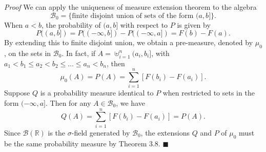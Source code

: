 \noindent\textit{Proof} We can apply the uniqueness of measure extension theorem to the algebra
\[
\mathcal{B}_0 = \{\text{finite disjoint union of sets of the form } (a, b]\}.
\]
When $a < b$, the probability of $(a, b]$ with respect to $P$ is given by
\[
P((a, b]) = P((-\infty, b]) - P((-\infty, a]) = F(b) - F(a).
\]
By extending this to finite disjoint union, we obtain a pre-measure, denoted by $\mu_0$, on the sets in $\mathcal{B}_0$. In fact, if $A = \uplus_{i=1}^n (a_i, b_i]$, with $a_1 < b_1 \le a_2 < b_2 \le \dots \le a_n < b_n$, then
\[
\mu_0(A) = P(A) = \sum_{i=1}^n [F(b_i) - F(a_i)].
\]
Suppose $Q$ is a probability measure identical to $P$ when restricted to sets in the form $(-\infty, a]$. Then for any $A \in \mathcal{B}_0$, we have
\[
Q(A) = \sum_{i=1}^n [F(b_i) - F(a_i)] = P(A).
\]
Since $\mathcal{B}(\mathbb{R})$ is the $\sigma$-field generated by $\mathcal{B}_0$, the extensions $Q$ and $P$ of $\mu_0$ must be the same probability measure by Theorem 3.8. \hfill $\blacksquare$